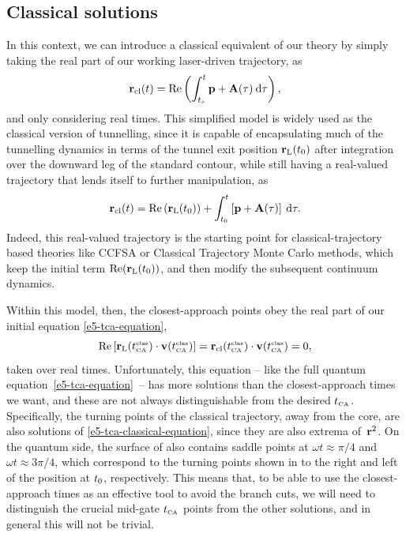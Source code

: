 \subsection{Classical solutions}
\label{sec:classical-tcas}

In this context, we can introduce a classical equivalent of our theory by simply taking the real part of our working laser-driven trajectory, as
\begin{equation}
\vb{r}_{\mathrm{cl}}(t) = \Re\left(\int_{{t_s}}^{t} \vb{p}+\vb{A}(\tau) \: \mathrm{d}\tau\right)
,
\label{e5-classical-trajectory}
\end{equation}
and only considering real times. This simplified model is widely used as the classical version of tunnelling, since it is capable of encapsulating much of the tunnelling dynamics in terms of the tunnel exit position $\vb{r}_\mathrm{L}({t_0})$ after integration over the downward leg of the standard contour, while still having a real-valued trajectory that lends itself to further manipulation, as
\begin{equation}
\vb{r}_{\mathrm{cl}}(t) =  \Re\left(\vb{r}_\mathrm{L}({t_0})\right) + \int_{{t_0}}^{t} \left[ \vb{p}+\vb{A}(\tau) \right] \: \mathrm{d}\tau
.
\label{e5-explicit-classical-trajectory}
\end{equation}
Indeed, this real-valued trajectory is the starting point for classical-trajectory based theories like CCFSA or Classical Trajectory Monte Carlo methods, which keep the initial term $\Re(\vb{r}_\mathrm{L}({t_0}))$, and then modify the subsequent continuum dynamics.

Within this model, then, the closest-approach points obey the real part of our initial equation \eqref{e5-tca-equation}, 
\begin{equation}
\Re\left[\vb{r}_\mathrm{L}({t_{\scriptscriptstyle\mathrm{CA}}^{\scriptscriptstyle \mathrm{clas}}})\cdot\vb{v}({t_{\scriptscriptstyle\mathrm{CA}}^{\scriptscriptstyle \mathrm{clas}}})\right]
=
\vb{r}_{\mathrm{cl}}({t_{\scriptscriptstyle\mathrm{CA}}^{\scriptscriptstyle \mathrm{clas}}})\cdot\vb{v}({t_{\scriptscriptstyle\mathrm{CA}}^{\scriptscriptstyle \mathrm{clas}}})=0
,
\label{e5-tca-classical-equation}
\end{equation}
taken over real times. Unfortunately, this equation -- like the full quantum equation~\eqref{e5-tca-equation}~-- has more solutions than the closest-approach times we want, and these are not always distinguishable from the desired ${t_{\scriptscriptstyle\mathrm{CA}}}$. Specifically, the turning points of the classical trajectory, away from the core, are also solutions of \eqref{e5-tca-classical-equation}, since they are also extrema of~$\vb{r}^2$. On the quantum side, the surface of  also contains saddle points at $\omega t\approx \pi/4$ and $\omega t \approx 3\pi/4$, which correspond to the turning points shown in  to the right and left of the position at ${t_0}$, respectively.  This means that, to be able to use the closest-approach times as an effective tool to avoid the branch cuts, we will need to distinguish the crucial mid-gate ${t_{\scriptscriptstyle\mathrm{CA}}}$ points from the other solutions, and in general this will not be trivial.

